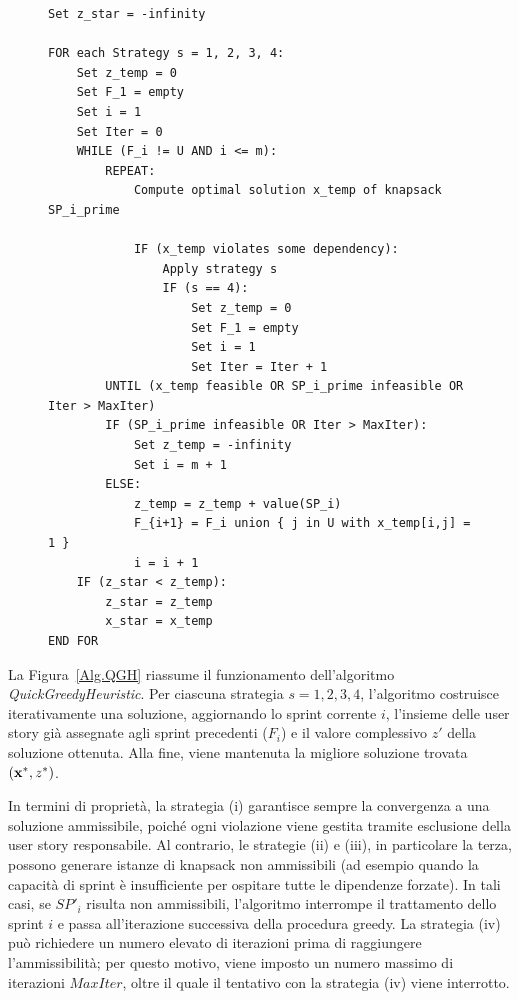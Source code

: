 \documentclass[12pt,a4paper,openright,twoside]{book}
\begin{document}
\begin{figure}[H]
\begin{lstlisting}[style=pseudo, caption={QuickGreedyHeuristic},label={Alg.QGH}]
Set z_star = -infinity

FOR each Strategy s = 1, 2, 3, 4:
    Set z_temp = 0
    Set F_1 = empty
    Set i = 1
    Set Iter = 0
    WHILE (F_i != U AND i <= m):
        REPEAT:
            Compute optimal solution x_temp of knapsack SP_i_prime

            IF (x_temp violates some dependency):
                Apply strategy s
                IF (s == 4):
                    Set z_temp = 0
                    Set F_1 = empty
                    Set i = 1
                    Set Iter = Iter + 1
        UNTIL (x_temp feasible OR SP_i_prime infeasible OR Iter > MaxIter)
        IF (SP_i_prime infeasible OR Iter > MaxIter):
            Set z_temp = -infinity
            Set i = m + 1
        ELSE:
            z_temp = z_temp + value(SP_i)
            F_{i+1} = F_i union { j in U with x_temp[i,j] = 1 }
            i = i + 1
    IF (z_star < z_temp):
        z_star = z_temp
        x_star = x_temp
END FOR
\end{lstlisting}
\end{figure}

La Figura~\ref{Alg.QGH} riassume il funzionamento dell'algoritmo \textit{QuickGreedyHeuristic}. Per ciascuna strategia $s = 1,2,3,4$, l'algoritmo costruisce iterativamente una soluzione, aggiornando lo sprint corrente $i$, l'insieme delle user story già assegnate agli sprint precedenti ($F_i$) e il valore complessivo $z'$ della soluzione ottenuta. Alla fine, viene mantenuta la migliore soluzione trovata $({\bf x}^*, z^*)$.

In termini di proprietà, la strategia (i) garantisce sempre la convergenza a una soluzione ammissibile, poiché ogni violazione viene gestita tramite esclusione della user story responsabile. Al contrario, le strategie (ii) e (iii), in particolare la terza, possono generare istanze di knapsack non ammissibili (ad esempio quando la capacità di sprint è insufficiente per ospitare tutte le dipendenze forzate). In tali casi, se $SP'_i$ risulta non ammissibili, l'algoritmo interrompe il trattamento dello sprint $i$ e passa all'iterazione successiva della procedura greedy. La strategia (iv) può richiedere un numero elevato di iterazioni prima di raggiungere l'ammissibilità; per questo motivo, viene imposto un numero massimo di iterazioni $\textit{MaxIter}$, oltre il quale il tentativo con la strategia (iv) viene interrotto.
\end{document}

